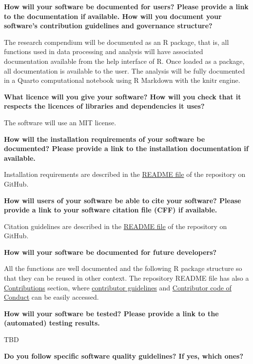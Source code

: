 \documentclass[
  letterpaper,
  DIV=11,
  numbers=noendperiod]{scrartcl}
\begin{document}
\textbf{How will your software be documented for users? Please provide a
link to the documentation if available. How will you document your
software's contribution guidelines and governance structure?}

The research compendium will be documented as an R package, that is, all
functions used in data processing and analysis will have associated
documentation available from the help interface of R. Once loaded as a
package, all documentation is available to the user. The analysis will
be fully documented in a Quarto computational notebook using R Markdown
with the knitr engine.

\textbf{What licence will you give your software? How will you check
that it respects the licences of libraries and dependencies it uses?}

The software will use an MIT license.

\textbf{How will the installation requirements of your software be
documented? Please provide a link to the installation documentation if
available.}

Installation requirements are described in the
\href{https://github.com/UD3-Lab/mintEMU\#how-to-run-in-your-browser-or-download-and-run-locally}{README
file} of the repository on GitHub.

\textbf{How will users of your software be able to cite your software?
Please provide a link to your software citation file (CFF) if
available.}

Citation guidelines are described in the
\href{https://github.com/UD3-Lab/mintEMU\#how-to-cite}{README file} of
the repository on GitHub.

\textbf{How will your software be documented for future developers?}

All the functions are well documented and the following R package
structure so that they can be reused in other context. The repository
README file has also a
\href{https://github.com/UD3-Lab/mintEMU\#contributions}{Contributions}
section, where
\href{https://github.com/UD3-Lab/mintEMU/blob/main/CONTRIBUTING.md}{contributor
guidelines} and
\href{https://github.com/UD3-Lab/mintEMU/blob/main/CONDUCT.md}{Contributor
code of Conduct} can be easily accessed.

\textbf{How will your software be tested? Please provide a link to the
(automated) testing results.}

TBD

\textbf{Do you follow specific software quality guidelines? If yes,
which ones?}
\end{document}
